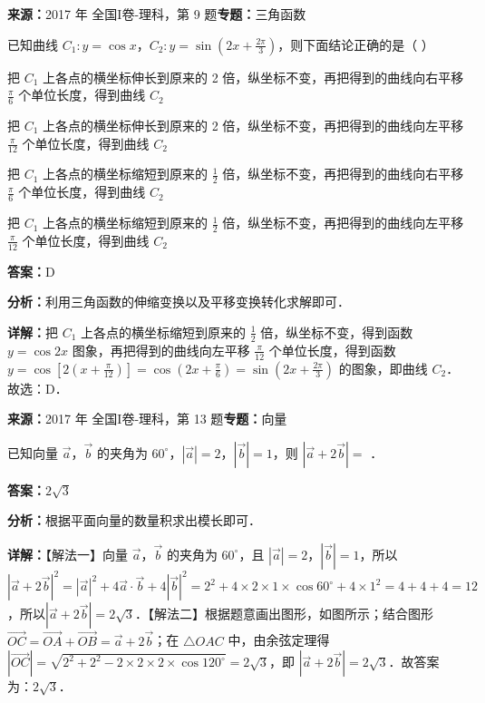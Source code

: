 \begin{question}[points=5]
\textbf{来源：}2017 年 全国I卷-理科，第 9 题\quad \textbf{专题：}三角函数\par
已知曲线 $C_1:y=\cos x$，$C_2:y=\sin\left(2x+\frac{2\pi}{3}\right)$，则下面结论正确的是（ ）
\begin{choices}
  \item 把 $C_1$ 上各点的横坐标伸长到原来的 2 倍，纵坐标不变，再把得到的曲线向右平移 $\frac{\pi}{6}$ 个单位长度，得到曲线 $C_2$
  \item 把 $C_1$ 上各点的横坐标伸长到原来的 2 倍，纵坐标不变，再把得到的曲线向左平移 $\frac{\pi}{12}$ 个单位长度，得到曲线 $C_2$
  \item 把 $C_1$ 上各点的横坐标缩短到原来的 $\frac{1}{2}$ 倍，纵坐标不变，再把得到的曲线向右平移 $\frac{\pi}{6}$ 个单位长度，得到曲线 $C_2$
  \item 把 $C_1$ 上各点的横坐标缩短到原来的 $\frac{1}{2}$ 倍，纵坐标不变，再把得到的曲线向左平移 $\frac{\pi}{12}$ 个单位长度，得到曲线 $C_2$
\end{choices}
\begin{solution}
\textbf{答案：}D

\textbf{分析：}利用三角函数的伸缩变换以及平移变换转化求解即可．

\textbf{详解：}把 $C_1$ 上各点的横坐标缩短到原来的 $\frac{1}{2}$ 倍，纵坐标不变，得到函数 $y=\cos 2x$ 图象，再把得到的曲线向左平移 $\frac{\pi}{12}$ 个单位长度，得到函数 $y=\cos\left[2\left(x+\frac{\pi}{12}\right)\right]=\cos\left(2x+\frac{\pi}{6}\right)=\sin\left(2x+\frac{2\pi}{3}\right)$ 的图象，即曲线 $C_2$．故选：D．
\end{solution}
\end{question}

\begin{question}[points=5]
\textbf{来源：}2017 年 全国I卷-理科，第 13 题\quad \textbf{专题：}向量\par
已知向量 $\vec{a}$，$\vec{b}$ 的夹角为 $60^\circ$，$|\vec{a}|=2$，$|\vec{b}|=1$，则 $|\vec{a}+2\vec{b}|=$ ．
\fillin[{$2\sqrt{3}$}]
\begin{solution}
\textbf{答案：}$2\sqrt{3}$

\textbf{分析：}根据平面向量的数量积求出模长即可．

\textbf{详解：}【解法一】向量 $\vec{a}$，$\vec{b}$ 的夹角为 $60^\circ$，且 $|\vec{a}|=2$，$|\vec{b}|=1$，所以$|\vec{a}+2\vec{b}|^2=|\vec{a}|^2+4\vec{a}\cdot\vec{b}+4|\vec{b}|^2=2^2+4\times2\times1\times\cos60^\circ+4\times1^2=4+4+4=12$，所以$|\vec{a}+2\vec{b}|=2\sqrt{3}$．【解法二】根据题意画出图形，如图所示；结合图形 $\overrightarrow{OC}=\overrightarrow{OA}+\overrightarrow{OB}=\vec{a}+2\vec{b}$；在 $\triangle OAC$ 中，由余弦定理得 $|\overrightarrow{OC}|=\sqrt{2^2+2^2-2\times2\times2\times\cos120^\circ}=2\sqrt{3}$，即 $|\vec{a}+2\vec{b}|=2\sqrt{3}$．故答案为：$2\sqrt{3}$．
\end{solution}
\end{question}

